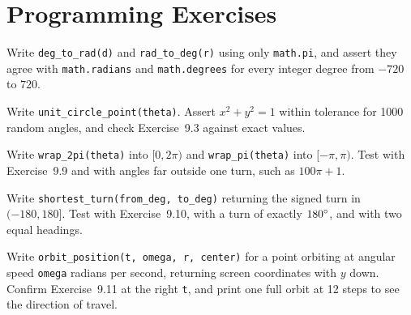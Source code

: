 \section{Programming Exercises}

\begin{codeexercises}
\item Write \lstinline!deg_to_rad(d)! and \lstinline!rad_to_deg(r)! using only \lstinline!math.pi!, and assert they agree with \lstinline!math.radians! and \lstinline!math.degrees! for every integer degree from $-720$ to $720$.
\item Write \lstinline!unit_circle_point(theta)!. Assert $x^2 + y^2 = 1$ within tolerance for 1000 random angles, and check Exercise~9.3 against exact values.
\item Write \lstinline!wrap_2pi(theta)! into $[0, 2\pi)$ and \lstinline!wrap_pi(theta)! into $[-\pi, \pi)$. Test with Exercise~9.9 and with angles far outside one turn, such as $100\pi + 1$.
\item Write \lstinline!shortest_turn(from_deg, to_deg)! returning the signed turn in $(-180, 180]$. Test with Exercise~9.10, with a turn of exactly $180^\circ$, and with two equal headings.
\item Write \lstinline!orbit_position(t, omega, r, center)! for a point orbiting at angular speed \lstinline!omega! radians per second, returning screen coordinates with $y$ down. Confirm Exercise~9.11 at the right \lstinline!t!, and print one full orbit at 12 steps to see the direction of travel.
\end{codeexercises}
